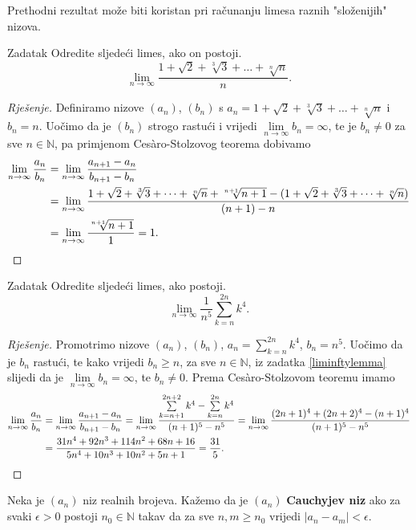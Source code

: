 Prethodni rezultat može biti koristan pri računanju limesa raznih "složenijih" nizova.
\begin{exercise}{Zadatak}
Odredite sljedeći limes, ako on postoji. 
\[\lim\limits_{n\to \infty}{\dfrac{1+\sqrt{2}+\sqrt[3]{3}+\dots+\sqrt[n]{n}}{n}}.\]
\end{exercise}
\begin{proof}[Rješenje]
Definiramo nizove \((a_n)\), \((b_n)\) s \(a_n=1+\sqrt{2}+\sqrt[3]{3}+\dots+\sqrt[n]{n}\) i \(b_n=n\). Uočimo da je \((b_n)\) strogo rastući i vrijedi \(\lim\limits_{n\to \infty}{b_n}=\infty\), te je \(b_n\neq 0\) za sve \(n\in \mathbb{N}\), pa primjenom Cesàro-Stolzovog teorema dobivamo
\begin{align*}
\lim\limits_{n\to \infty}{\dfrac{a_n}{b_n}}&=\lim\limits_{n\to \infty}{\dfrac{a_{n+1}-a_n}{b_{n+1}-b_n}}\\
&=\lim\limits_{n\to \infty}{\dfrac{1+\sqrt{2}+\sqrt[3]{3}+\dots+\sqrt[n]{n}+\sqrt[n+1]{n+1}-(1+\sqrt{2}+\sqrt[3]{3}+\dots+\sqrt[n]{n})}{(n+1)-n}}\\
&=\lim\limits_{n\to \infty}{\dfrac{\sqrt[n+1]{n+1}}{1}}=1.\qedhere
\end{align*}
\end{proof}
\begin{exercise}{Zadatak}
Odredite sljedeći limes, ako postoji.
\[\lim\limits_{n\to \infty}{\dfrac{1}{n^5}\sum_{k=n}^{2n}{k^4}}.\]
\end{exercise}
\begin{proof}[Rješenje]
Promotrimo nizove \((a_n)\), \((b_n)\), \(a_n=\sum\limits_{k=n}^{2n}{k^4}\), \(b_n=n^5\). Uočimo da je \(b_n\) rastući, te kako vrijedi \(b_n\geq n\), za sve \(n\in \mathbb{N}\), iz zadatka \ref{liminftylemma} slijedi da je \(\lim\limits_{n\to \infty}{b_n}=\infty\), te \(b_n\neq 0\). Prema Cesàro-Stolzovom teoremu imamo
\begin{align*}
\lim\limits_{n\to \infty}{\dfrac{a_n}{b_n}}&=\lim\limits_{n\to\infty}{\dfrac{a_{n+1}-a_n}{b_{n+1}-b_n}}
=\lim\limits_{n\to \infty}{\dfrac{\sum\limits_{k=n+1}^{2n+2}{k^4}-\sum\limits_{k=n}^{2n}{k^4}}{(n+1)^5-n^5}}=\lim\limits_{n\to \infty}{\dfrac{(2n+1)^4+(2n+2)^4-(n+1)^4}{(n+1)^5-n^5}}\\
&=\dfrac{31n^4+92n^3+114n^2+68n+16}{5n^4+10n^3+10n^2+5n+1}=\dfrac{31}{5}.\qedhere
\end{align*}
\end{proof}
\begin{definition}
Neka je $(a_n)$ niz realnih brojeva. Kažemo da je $(a_n)$ \textbf{Cauchyjev niz} ako za svaki $\epsilon>0$ postoji $n_0\in \mathbb{N}$ takav da za sve $n, m\geq n_0$ vrijedi $\lvert a_n-a_m\rvert<\epsilon$.
\end{definition}

